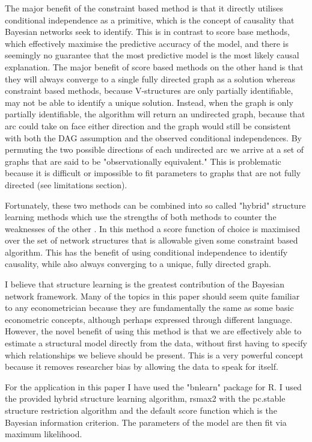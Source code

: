 \documentclass{article}
\begin{document}
The major benefit of the constraint based method is that it directly utilises conditional independence as a primitive, which is the concept of causality that Bayesian networks seek to identify. This is in contrast to score base methods, which effectively maximise the predictive accuracy of the model, and there is seemingly no guarantee that the most predictive model is the most likely causal explanation. The major benefit of score based methods on the other hand is that they will always converge to a single fully directed graph as a solution whereas constraint based methods, because V-structures are only partially identifiable, may not be able to identify a unique solution. Instead, when the graph is only partially identifiable, the algorithm will return an undirected graph, because that arc could take on face either direction and the graph would still be consistent with both the DAG assumption and the observed conditional independences. By permuting the two possible directions of each undirected arc we arrive at a set of graphs that are said to be "observationally equivalent." This is problematic because it is difficult or impossible to fit parameters to graphs that are not fully directed (see limitations section).  

Fortunately, these two methods can be combined into so called "hybrid" structure learning methods which use the strengths of both methods to counter the weaknesses of the other \parencite{scutari2014multiple}. In this method a score function of choice is maximised over the set of network structures that is allowable given some constraint based algorithm. This has the benefit of using conditional independence to identify causality, while also always converging to a unique, fully directed graph.

I believe that structure learning is the greatest contribution of the Bayesian network framework. Many of the topics in this paper should seem quite familiar to any econometrician because they are fundamentally the same as some basic econometric concepts, although perhaps expressed through different language. However, the novel benefit of using this method is that we are effectively able to estimate a structural model directly from the data, without first having to specify which relationships we believe should be present. This is a very powerful concept because it removes researcher bias by allowing the data to speak for itself.

For the application in this paper I have used the "bnlearn" package \parencite{scutari2010bnlearn} for R. I used the provided hybrid structure learning algorithm, rsmax2 with the pc.stable structure restriction algorithm and the default score function which is the Bayesian information criterion. The parameters of the model are then fit via maximum likelihood. 
\end{document}
